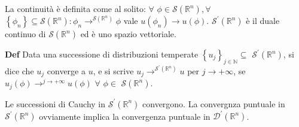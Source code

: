 \documentclass{article}
\begin{document}
La continuit\`{a} \`{e} definita come al solito: $\forall $ $\phi \in 
\mathcal{S}\left( 
\mathbb{R}
^{n}\right) ,\forall $ $\left\{ \phi _{n}\right\} \subseteq \mathcal{S}%
\left( 
\mathbb{R}
^{n}\right) :\phi _{n}\rightarrow ^{\mathcal{S}\left( 
\mathbb{R}
^{n}\right) }\phi $ vale $u\left( \phi _{n}\right) \rightarrow u\left( \phi
\right) $. $\mathcal{S}^{\prime }\left( 
\mathbb{R}
^{n}\right) $ \`{e} il duale continuo di $\mathcal{S}\left( 
\mathbb{R}
^{n}\right) $ ed \`{e} uno spazio vettoriale.

\textbf{Def} Data una successione di distribuzioni temperate $\left\{
u_{j}\right\} _{j\in 
\mathbb{N}
}\subseteq $ $\mathcal{S}^{\prime }\left( 
\mathbb{R}
^{n}\right) $, si dice che $u_{j}$ converge a $u$, e si scrive $%
u_{j}\rightarrow ^{\mathcal{S}^{\prime }\left( 
\mathbb{R}
^{n}\right) }u$ per $j\rightarrow +\infty $, se $u_{j}\left( \phi \right)
\rightarrow ^{j\rightarrow +\infty }u\left( \phi \right) $ $\forall $ $\phi
\in $ $\mathcal{S}\left( 
\mathbb{R}
^{n}\right) $.

Le successioni di Cauchy in $\mathcal{S}^{\prime }\left( 
\mathbb{R}
^{n}\right) $ convergono. La convergnza puntuale in $\mathcal{S}^{\prime
}\left( 
\mathbb{R}
^{n}\right) $ ovviamente implica la convergenza puntuale in $\mathcal{D}%
^{\prime }\left( 
\mathbb{R}
^{n}\right) $.
\end{document}
